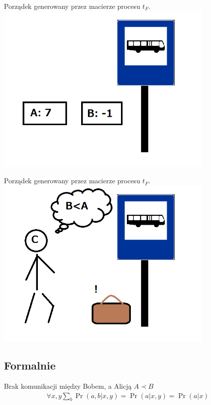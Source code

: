 \documentclass{beamer}
\begin{document}
\begin{frame}{Porządek generowany przez macierze procesu $t_F$.}
\centering
\includegraphics[width=0.8\textwidth]{obrazki/pF}
\end{frame}

\begin{frame}{Porządek generowany przez macierze procesu $t_F$.}
\centering
\includegraphics[width=0.8\textwidth]{obrazki/pC}
\end{frame}

\subsection{Formalnie}
\begin{frame}{Brak komunikacji między Bobem, a Alicją}
\centering
$A \prec B$
\begin{gather}
\forall x, y \sum_{b} \Pr(a, b|x, y) = \Pr(a|x,y) = \Pr(a|x)
\end{gather}
\end{frame}
\end{document}
